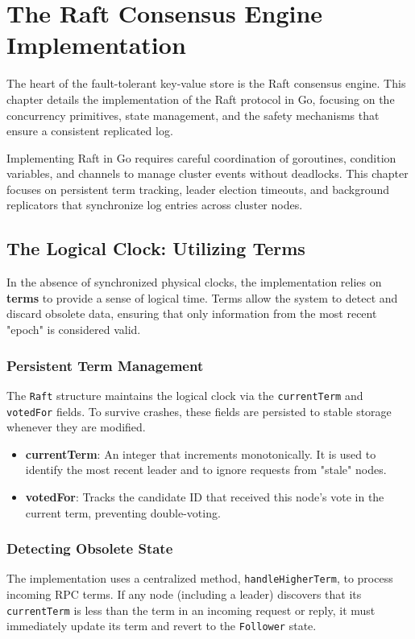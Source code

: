 \chapter{The Raft Consensus Engine Implementation}
\label{ch:raft_implementation}

The heart of the fault-tolerant key-value store is the Raft consensus engine. This chapter details the implementation of the Raft protocol in Go, focusing on the concurrency primitives, state management, and the safety mechanisms that ensure a consistent replicated log.

Implementing Raft in Go requires careful coordination of goroutines, condition variables, and channels to manage cluster events without deadlocks. This chapter focuses on persistent term tracking, leader election timeouts, and background replicators that synchronize log entries across cluster nodes.

\section{The Logical Clock: Utilizing Terms}
In the absence of synchronized physical clocks, the implementation relies on \textbf{terms} to provide a sense of logical time. Terms allow the system to detect and discard obsolete data, ensuring that only information from the most recent "epoch" is considered valid.

\subsection{Persistent Term Management}
The \texttt{Raft} structure maintains the logical clock via the \texttt{currentTerm} and \texttt{votedFor} fields. To survive crashes, these fields are persisted to stable storage whenever they are modified.

\begin{itemize}
    \item \textbf{currentTerm}: An integer that increments monotonically. It is used to identify the most recent leader and to ignore requests from "stale" nodes.
    \item \textbf{votedFor}: Tracks the candidate ID that received this node's vote in the current term, preventing double-voting.
\end{itemize}

\subsection{Detecting Obsolete State}
The implementation uses a centralized method, \texttt{handleHigherTerm}, to process incoming RPC terms.
If any node (including a leader) discovers that its \texttt{currentTerm} is less than the term in an incoming request or reply, it must immediately update its term and revert to the \texttt{Follower} state.

